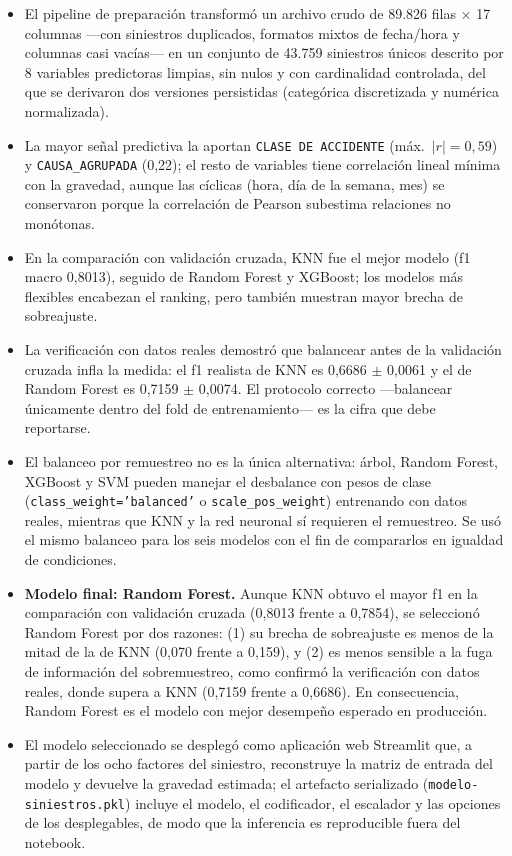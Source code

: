 \documentclass[11pt]{article}
\newcommand{\vartxt}[1]{\texttt{#1}}
\begin{document}
\begin{itemize}\setlength\itemsep{0.15em}
  \item El pipeline de preparación transformó un archivo crudo de 89.826 filas $\times$ 17 columnas ---con siniestros duplicados, formatos mixtos de fecha/hora y columnas casi vacías--- en un conjunto de 43.759 siniestros únicos descrito por 8 variables predictoras limpias, sin nulos y con cardinalidad controlada, del que se derivaron dos versiones persistidas (categórica discretizada y numérica normalizada).
  \item La mayor señal predictiva la aportan \vartxt{CLASE DE ACCIDENTE} (máx.\ $|r|=0{,}59$) y \vartxt{CAUSA\_AGRUPADA} (0,22); el resto de variables tiene correlación lineal mínima con la gravedad, aunque las cíclicas (hora, día de la semana, mes) se conservaron porque la correlación de Pearson subestima relaciones no monótonas.
  \item En la comparación con validación cruzada, KNN fue el mejor modelo (f1 macro 0,8013), seguido de Random Forest y XGBoost; los modelos más flexibles encabezan el ranking, pero también muestran mayor brecha de sobreajuste.
  \item La verificación con datos reales demostró que balancear antes de la validación cruzada infla la medida: el f1 realista de KNN es 0,6686 $\pm$ 0,0061 y el de Random Forest es 0,7159 $\pm$ 0,0074. El protocolo correcto ---balancear únicamente dentro del fold de entrenamiento--- es la cifra que debe reportarse.
  \item El balanceo por remuestreo no es la única alternativa: árbol, Random Forest, XGBoost y SVM pueden manejar el desbalance con pesos de clase (\vartxt{class\_weight='balanced'} o \vartxt{scale\_pos\_weight}) entrenando con datos reales, mientras que KNN y la red neuronal sí requieren el remuestreo. Se usó el mismo balanceo para los seis modelos con el fin de compararlos en igualdad de condiciones.
  \item \textbf{Modelo final: Random Forest.} Aunque KNN obtuvo el mayor f1 en la comparación con validación cruzada (0,8013 frente a 0,7854), se seleccionó Random Forest por dos razones: (1) su brecha de sobreajuste es menos de la mitad de la de KNN (0,070 frente a 0,159), y (2) es menos sensible a la fuga de información del sobremuestreo, como confirmó la verificación con datos reales, donde supera a KNN (0,7159 frente a 0,6686). En consecuencia, Random Forest es el modelo con mejor desempeño esperado en producción.
  \item El modelo seleccionado se desplegó como aplicación web Streamlit que, a partir de los ocho factores del siniestro, reconstruye la matriz de entrada del modelo y devuelve la gravedad estimada; el artefacto serializado (\vartxt{modelo-siniestros.pkl}) incluye el modelo, el codificador, el escalador y las opciones de los desplegables, de modo que la inferencia es reproducible fuera del notebook.
\end{itemize}
\end{document}
